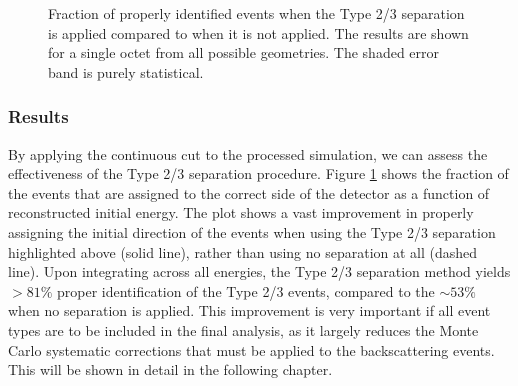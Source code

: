 \begin{figure}[h]
  \caption{Fraction of properly identified events when the Type 2/3
    separation is applied compared to when it is not applied. The results are shown for a single octet from all possible
    geometries. The shaded error band is purely statistical.}
  \label{fig:sepResults}
\end{figure}

\subsubsection{Results}

By applying the continuous cut to the processed simulation, we can assess the
effectiveness of the Type 2/3 separation procedure. 
Figure \ref{fig:sepResults} shows the fraction of the events that are assigned to the correct
side of the detector as a function of reconstructed initial energy. The plot shows a vast improvement in
properly assigning the initial direction of the events when using the Type 2/3 separation
highlighted above (solid line), rather than using no separation at all (dashed line).
Upon integrating across all energies, the Type 2/3 separation method yields $>81\%$ proper identification
of the Type 2/3 events,
compared to the $\sim53\%$
when no separation is applied. This improvement is very important if all event types
are to be included in the final analysis, as it largely reduces the
Monte Carlo systematic corrections that must be applied to the backscattering events.
This will be shown in detail in the following chapter.










